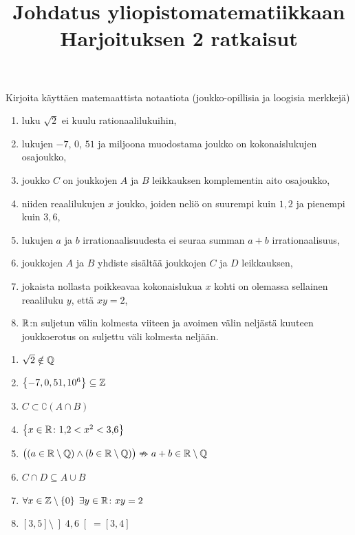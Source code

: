 \documentclass[11pt,a4paper]{amsart}
\title{Johdatus yliopistomatematiikkaan\\Harjoituksen 2 ratkaisut}
\date{}
\author{}
\begin{document}

\begin{exercise}
  Kirjoita käyttäen matemaattista notaatiota (joukko-opillisia ja loogisia
  merkkejä)
\begin{enumerate}[label=\alph*), nosep]
  \item luku \(\sqrt{2}\) ei kuulu rationaalilukuihin,
  \item lukujen \(-7\), \(0\), \(51\) ja miljoona muodostama joukko on
    kokonaislukujen osajoukko,
  \item joukko \(C\) on joukkojen \(A\) ja \(B\) leikkauksen komplementin
    aito osajoukko,
  \item niiden reaalilukujen \(x\) joukko, joiden neliö on suurempi kuin
    \(1{,}2\) ja pienempi kuin \(3{,}6\),
  \item lukujen \(a\) ja \(b\) irrationaalisuudesta ei seuraa summan
    \(a + b\) irrationaalisuus,
  \item joukkojen \(A\) ja \(B\) yhdiste sisältää joukkojen \(C\) ja \(D\)
    leikkauksen,
  \item jokaista nollasta poikkeavaa kokonaislukua \(x\) kohti on olemassa
    sellainen reaaliluku \(y\), että \(xy = 2\),
  \item \(\mathbb{R}\):n suljetun välin kolmesta viiteen ja avoimen välin neljästä
    kuuteen joukkoerotus on suljettu väli kolmesta neljään.
\end{enumerate}
\end{exercise}

\begin{solution}
\leavevmode\par
\begin{enumerate}[label=\alph*), nosep]
\item \(\sqrt{2} \notin \mathbb{Q}\)
\item \(\left\lbrace-7, 0, 51, 10^6\right\rbrace \subseteq \mathbb{Z}\)
\item \(C \subset \complement{(A \cap B)}\)
\item \(\left\lbrace x \in \mathbb{R} \colon 1{,}2 < x^2 < 3{,}6\right\rbrace\)
\item \(\bigl((a \in \mathbb{R} \setminus \mathbb{Q}) \land (b \in \mathbb{R} \setminus \mathbb{Q})\bigr)
  \nRightarrow a + b \in \mathbb{R} \setminus \mathbb{Q}\)
\item \(C \cap D \subseteq A \cup B\)
\item \(\forall x \in \mathbb{Z} \setminus \left\lbrace0\right\rbrace \; \exists y \in \mathbb{R}
  \colon xy = 2\)
\item \([3, 5] \setminus \left]4, 6\right[ = [3, 4]\)
\end{enumerate}
\end{solution}
\end{document}
